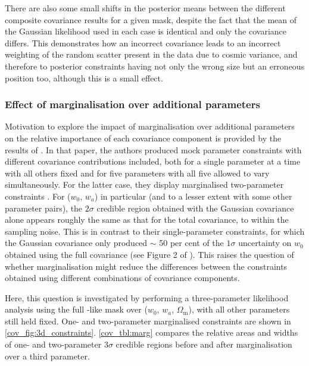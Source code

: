 There are also some small shifts in the posterior means between the different composite covariance results for a given mask, despite the fact that the mean of the Gaussian likelihood used in each case is identical and only the covariance differs. This demonstrates how an incorrect covariance leads to an incorrect weighting of the random scatter present in the data due to cosmic variance, and therefore to posterior constraints having not only the wrong size but an erroneous position too, although this is a small effect.

\subsubsection{Effect of marginalisation over additional parameters}

Motivation to explore the impact of marginalisation over additional parameters on the relative importance of each covariance component is provided by the results of \citet{Barreira2018b}. In that paper, the authors produced mock parameter constraints with different covariance contributions included, both for a single parameter at a time with all others fixed and for five parameters with all five allowed to vary simultaneously. For the latter case, they display marginalised two-parameter constraints \citep[their Figure 3]{Barreira2018b}. For ($w_0$, $w_a$) in particular (and to a lesser extent with some other parameter pairs), the $2\sigma$ credible region obtained with the Gaussian covariance alone appears roughly the same as that for the total covariance, to within the sampling noise. This is in contrast to their single-parameter constraints, for which the Gaussian covariance only produced $\sim$ 50 per cent of the $1\sigma$ uncertainty on $w_0$ obtained using the full covariance (see Figure 2 of \citealt{Barreira2018b}). This raises the question of whether marginalisation might reduce the differences between the constraints obtained using different combinations of covariance components.

Here, this question is investigated by performing a three-parameter likelihood analysis using the full \Euclid{}-like mask over ($w_0$, $w_a$, $\Omega_\text{m}$), with all other parameters still held fixed. One- and two-parameter marginalised constraints are shown in \autoref{cov_fig:3d_constraints}. \autoref{cov_tbl:marg} compares the relative areas and widths of one- and two-parameter $3\sigma$ credible regions before and after marginalisation over a third parameter.

